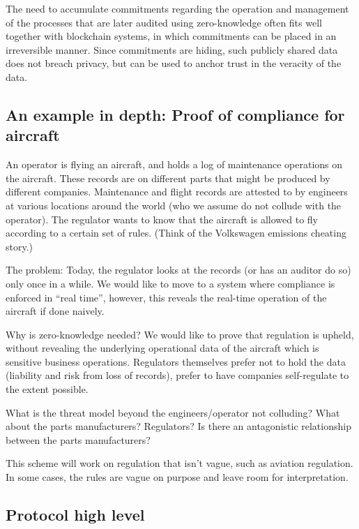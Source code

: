 The need to accumulate commitments regarding the operation and management of the processes that are later audited using zero-knowledge often fits well together with blockchain systems, in which commitments can be placed in an irreversible manner. Since commitments are hiding, such publicly shared data does not breach privacy, but can be used to anchor trust in the veracity of the data. 


\subsection{An example in depth: Proof of compliance for aircraft}

An operator is flying an aircraft, and holds a log of maintenance operations on the aircraft.  These records are on different parts that might be produced by different companies.
Maintenance and flight records are attested to by engineers at various locations around the world (who we assume do not collude with the operator). \newline
The regulator wants to know that the aircraft is allowed to fly according to a certain set of rules.
(Think of the Volkswagen emissions cheating story.)

The problem: Today, the regulator looks at the records (or has an auditor do so) only once in a while. We would like to move to a system where compliance is enforced in “real time”, however, this reveals the real-time operation of the aircraft if done naively.

Why is zero-knowledge needed? We would like to prove that regulation is upheld, without revealing the underlying operational data of the aircraft which is sensitive business operations. 
Regulators themselves prefer not to hold the data (liability and risk from loss of records), prefer to have companies self-regulate to the extent possible. 

What is the threat model beyond the engineers/operator not colluding?  What about the parts manufacturers?  Regulators?  Is there an antagonistic relationship between the parts manufacturers?

This scheme will work on regulation that isn't vague, such as aviation regulation. In some cases, the rules are vague on purpose and leave room for interpretation.



\subsection{Protocol high level}

